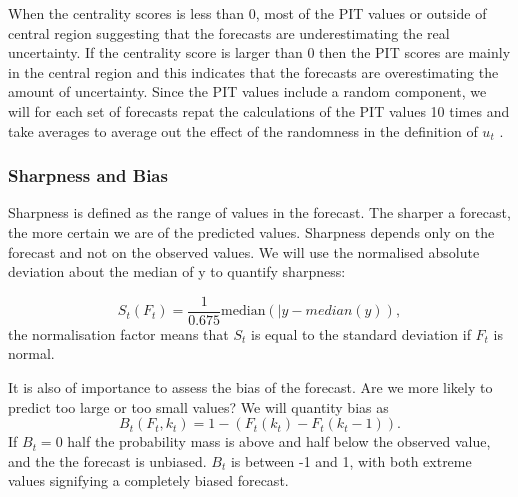 \documentclass[12pt]{article}
\begin{document}
When the centrality scores is less than 0, most of the PIT values or outside of central region suggesting that the forecasts are underestimating the real uncertainty.  If the centrality score is larger than 0 then the PIT scores are mainly in the central region and this indicates that the forecasts are overestimating the amount of uncertainty. Since the PIT values include a random component, we will for each set of forecasts repat the calculations of the PIT values 10 times and take averages to average out the effect of the randomness in the definition of $u_t$ \cite{funkAssessingPerformanceRealtime2019}. 

\subsubsection{Sharpness and Bias}
Sharpness is defined as the range of values in the forecast. The sharper a forecast, the more certain we are of the predicted values. Sharpness depends only on the forecast and not on the observed values. We will use the normalised absolute deviation about the median of y to quantify sharpness:

\[ S_t(F_t) = \frac{1}{0.675} \text{median}(|y - median(y)),\]
the normalisation factor means that $S_t$ is equal to the standard deviation if $F_t$ is normal.

It is also of importance to assess the bias of the forecast. Are we more likely to predict too large or too small values? We will quantity bias as
\[B_t(F_t, k_t) = 1 - (F_t(k_t) - F_t(k_t - 1)).\]
If $B_t=0$ half the probability mass is above and half below the observed value, and the the forecast is unbiased. $B_t$ is between -1 and 1, with both extreme values signifying a completely biased forecast.
\end{document}
